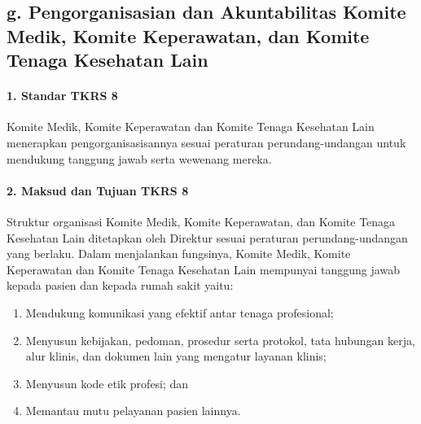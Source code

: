 \documentclass[
]{book}
\providecommand{\tightlist}{%
  \setlength{\itemsep}{0pt}\setlength{\parskip}{0pt}}
\begin{document}
\hypertarget{g.-pengorganisasian-dan-akuntabilitas-komite-medik-komite-keperawatan-dan-komite-tenaga-kesehatan-lain}{%
\subsection*{g. Pengorganisasian dan Akuntabilitas Komite Medik, Komite Keperawatan, dan Komite Tenaga Kesehatan Lain}\label{g.-pengorganisasian-dan-akuntabilitas-komite-medik-komite-keperawatan-dan-komite-tenaga-kesehatan-lain}}

\hypertarget{standar-tkrs-8}{%
\paragraph*{1. Standar TKRS 8}\label{standar-tkrs-8}}

Komite Medik, Komite Keperawatan dan Komite Tenaga Kesehatan Lain menerapkan pengorganisasisannya sesuai peraturan perundang-undangan untuk mendukung tanggung jawab serta wewenang mereka.

\hypertarget{maksud-dan-tujuan-tkrs-8}{%
\paragraph*{2. Maksud dan Tujuan TKRS 8}\label{maksud-dan-tujuan-tkrs-8}}

Struktur organisasi Komite Medik, Komite Keperawatan, dan Komite Tenaga Kesehatan Lain ditetapkan oleh Direktur sesuai peraturan perundang-undangan yang berlaku. Dalam menjalankan fungsinya, Komite Medik, Komite Keperawatan dan Komite Tenaga Kesehatan Lain mempunyai tanggung jawab kepada pasien dan kepada rumah sakit yaitu:

\begin{enumerate}
\def\labelenumi{\alph{enumi}.}
\tightlist
\item
  Mendukung komunikasi yang efektif antar tenaga profesional;
\item
  Menyusun kebijakan, pedoman, prosedur serta protokol, tata hubungan kerja, alur klinis, dan dokumen lain yang mengatur layanan klinis;
\item
  Menyusun kode etik profesi; dan
\item
  Memantau mutu pelayanan pasien lainnya.
\end{enumerate}
\end{document}
